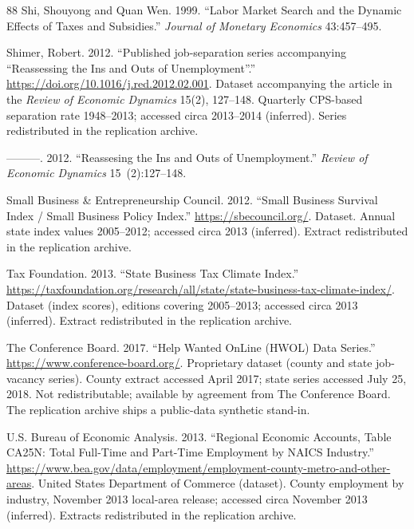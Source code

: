 \documentclass[12pt]{article}
\newcommand{\1}{\mathbf{1}}
\begin{document}
\begin{thebibliography}{88}
Shi, Shouyong and Quan Wen. 1999.
\newblock \enquote{Labor Market Search and the Dynamic Effects of Taxes and Subsidies.}
\newblock \emph{Journal of Monetary Economics} 43:457--495.

Shimer, Robert. 2012{}.
\newblock \enquote{Published job-separation series accompanying ``Reassessing the Ins and Outs of Unemployment''.}
\newblock \urlprefix\url{https://doi.org/10.1016/j.red.2012.02.001}.
\newblock Dataset accompanying the article in the \emph{Review of Economic Dynamics} 15(2), 127--148. Quarterly {CPS}-based separation rate 1948--2013; accessed circa 2013--2014 (inferred). Series redistributed in the replication archive.

---{}---{}---. 2012{}.
\newblock \enquote{Reassesing the Ins and Outs of Unemployment.}
\newblock \emph{Review of Economic Dynamics} 15~(2):127--148.

{Small Business \& Entrepreneurship Council}. 2012.
\newblock \enquote{Small Business Survival Index / Small Business Policy Index.}
\newblock \urlprefix\url{https://sbecouncil.org/}.
\newblock Dataset. Annual state index values 2005--2012; accessed circa 2013 (inferred). Extract redistributed in the replication archive.

{Tax Foundation}. 2013.
\newblock \enquote{State Business Tax Climate Index.}
\newblock \urlprefix\url{https://taxfoundation.org/research/all/state/state-business-tax-climate-index/}.
\newblock Dataset (index scores), editions covering 2005--2013; accessed circa 2013 (inferred). Extract redistributed in the replication archive.

{The Conference Board}. 2017.
\newblock \enquote{Help Wanted OnLine ({HWOL}) Data Series.}
\newblock \urlprefix\url{https://www.conference-board.org/}.
\newblock Proprietary dataset (county and state job-vacancy series). County extract accessed April 2017; state series accessed July 25, 2018. Not redistributable; available by agreement from The Conference Board. The replication archive ships a public-data synthetic stand-in.

{U.S. Bureau of Economic Analysis}. 2013.
\newblock \enquote{Regional Economic Accounts, Table {CA25N}: Total Full-Time and Part-Time Employment by {NAICS} Industry.}
\newblock \urlprefix\url{https://www.bea.gov/data/employment/employment-county-metro-and-other-areas}.
\newblock United States Department of Commerce (dataset). County employment by industry, November 2013 local-area release; accessed circa November 2013 (inferred). Extracts redistributed in the replication archive.


\end{thebibliography}
\end{document}
